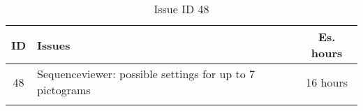 \begin{longtable} { | c | p{12cm} | c | } 
\hline
	ID 	&	Issues	&		 Es. hours \\\hline
	 48	&	Sequenceviewer: possible settings for up to 7 pictograms	&	16 hours \\\hline
\caption{Issue ID 48}
\label{tab:spr3_SVsettingsupto7pictograms}
\end{longtable}
